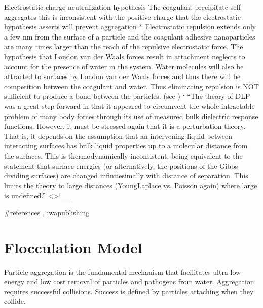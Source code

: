 \documentclass[letterpaper,10pt,english]{sphinxmanual}
\begin{document}
Electrostatic charge neutralization hypothesis The coagulant precipitate self aggregates \textendash{} this is inconsistent with the positive charge that the electrostatic hypothesis asserts will prevent aggregation * Electrostatic repulsion extends only a few nm from the surface of a particle \textendash{} and the coagulant adhesive nanoparticles are many times larger than the reach of the repulsive electrostatic force. The hypothesis that London van der Waals forces result in attachment neglects to account for the presence of water in the system. Water molecules will also be attracted to surfaces by London van der Waals forces and thus there will be competition between the coagulant and water. Thus eliminating repulsion is NOT sufficient to produce a bond between the particles. (see ) {}` “The theory of DLP was a great step forward in that it appeared to circumvent the whole intractable problem of many body forces through its use of measured bulk dielectric response functions. However, it must be stressed again that it is a perturbation theory. That is, it depends on the assumption that an intervening liquid between interacting surfaces has bulk liquid properties up to a molecular distance from the surfaces. This is thermodynamically inconsistent, being equivalent to the statement that surface energies (or alternatively, the positions of the Gibbs dividing surfaces) are changed infinitesimally with distance of separation. This limits the theory to large distances (Young\textendash{}Laplace vs. Poisson again) where large is undefined.” \textless{}\textgreater{}{}`\_\_

\#references ,
iwapublishing


\chapter{Flocculation Model}
\label{\detokenize{Flocculation/Floc_Model:flocculation-model}}\label{\detokenize{Flocculation/Floc_Model:title-flocculation-model}}\label{\detokenize{Flocculation/Floc_Model::doc}}
Particle aggregation is the fundamental mechanism that facilitates ultra low energy and low cost removal of particles and pathogens from water. Aggregation requires successful collisions. Success is defined by particles  attaching when they collide.
\end{document}
